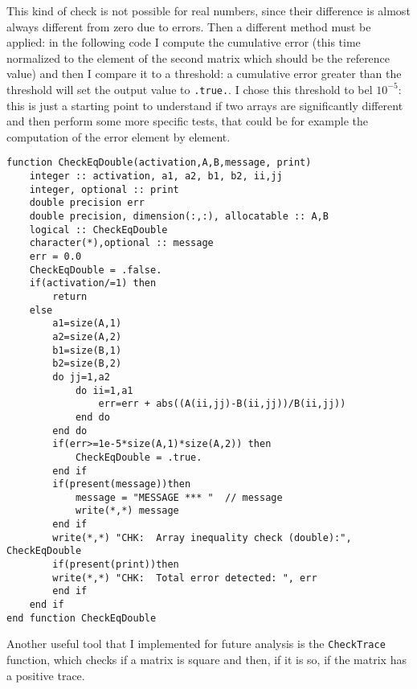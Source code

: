 \documentclass[a4paper]{article}
\begin{document}
\noindent This kind of check is not possible for real numbers, since their difference is almost always different from zero due to errors.
Then a different method must be applied: in the following code I compute the cumulative error (this time normalized to the element of the second matrix which should be the reference value) and then I compare it to a threshold: a cumulative error greater than the threshold will set the output value to \lstinline{.true.}.
I chose this threshold to bel $10^{-5}:$ this is just a starting point to understand if two arrays are significantly different and then perform some more specific tests, that could be for example the computation of the error element by element.
\begin{lstlisting}
function CheckEqDouble(activation,A,B,message, print)
    integer :: activation, a1, a2, b1, b2, ii,jj
    integer, optional :: print
    double precision err
    double precision, dimension(:,:), allocatable :: A,B
    logical :: CheckEqDouble
    character(*),optional :: message
    err = 0.0
    CheckEqDouble = .false.
    if(activation/=1) then
        return
    else
        a1=size(A,1)
        a2=size(A,2)
        b1=size(B,1)
        b2=size(B,2)
        do jj=1,a2
            do ii=1,a1
                err=err + abs((A(ii,jj)-B(ii,jj))/B(ii,jj))
            end do
        end do
        if(err>=1e-5*size(A,1)*size(A,2)) then
            CheckEqDouble = .true.
        end if
        if(present(message))then
            message = "MESSAGE *** "  // message
            write(*,*) message
        end if
        write(*,*) "CHK:  Array inequality check (double):", CheckEqDouble
        if(present(print))then
        write(*,*) "CHK:  Total error detected: ", err
        end if
    end if
end function CheckEqDouble
\end{lstlisting}

\noindent Another useful tool that I implemented for future analysis is the \lstinline{CheckTrace} function, which checks if a matrix is square and then, if it is so, if the matrix has a positive trace.
\end{document}
